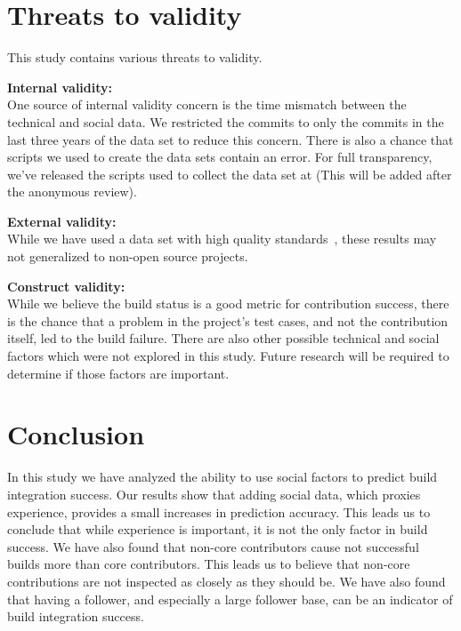 \documentclass[10pt, conference]{IEEEtran}
\begin{document}
\section{Threats to validity}
This study contains various threats to validity.

\noindent\textbf{Internal validity:}\\
One source of internal validity concern is the time mismatch between the
technical and social data.  We restricted the commits to only the commits in the
last three years of the data set to reduce this concern.
There is also a chance that scripts we used to create the data sets contain an
error.  For full transparency, we've released the scripts used to collect the
data set at (This will be added after the anonymous review).


\noindent\textbf{External validity:} \\
While we have used a data set with high quality standards~\cite{msr17challenge},
these results may not generalized to non-open source projects.

\noindent\textbf{Construct validity:}\\
While we believe the build status is a good metric for contribution success,
there is the chance that a problem in the project's test cases, and not the
contribution itself, led to the build failure.  There are also other possible
technical and social factors which were not explored in this study.  Future
research will be required to determine if those factors are important.

\section{Conclusion}
In this study we have analyzed the ability to use social factors to predict
build integration success.
Our results show that adding social data, which proxies experience, provides a
small increases in prediction accuracy.  This leads us to conclude that while
experience is important, it is not the only factor in build success.
We have also found that non-core contributors cause not successful builds more
than core contributors.  This leads us to believe that non-core contributions
are not inspected as closely as they should be.  We have also found that having
a follower, and especially a large follower base, can be an indicator of build
integration success. 

\end{document}

